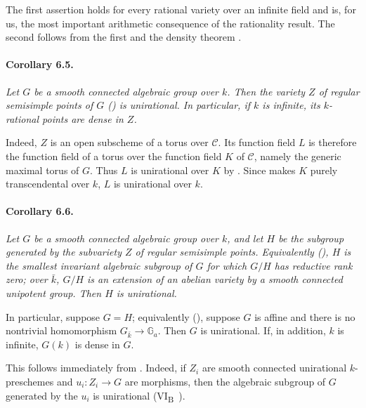 The first assertion holds for every rational variety over an
infinite field and is, for us, the most important arithmetic
consequence of the rationality result. The second follows from
the first and the density theorem .

\paragraph{\textbf{Corollary 6.5.}}
{\itshape Let \(G\) be a smooth connected algebraic group over
\(k\). Then the variety \(Z\) of regular semisimple points of
\(G\) \textup{()} is unirational. In particular, if
\(k\) is infinite, its \(k\)-rational points are dense in \(Z\).}

Indeed, \(Z\) is an open subscheme of a torus over
\(\mathcal C\). Its function field \(L\) is therefore the
function field of a torus over the function field \(K\) of
\(\mathcal C\), namely the generic maximal torus of \(G\). Thus
\(L\) is unirational over \(K\) by . Since  makes
\(K\) purely transcendental over \(k\), \(L\) is unirational
over \(k\).

\paragraph{\textbf{Corollary 6.6.}}
{\itshape Let \(G\) be a smooth connected algebraic group over
\(k\), and let \(H\) be the subgroup generated by the subvariety
\(Z\) of regular semisimple points. Equivalently
\textup{()}, \(H\) is the smallest invariant algebraic
subgroup of \(G\) for which \(G/H\) has reductive rank zero; over
\(\bar k\), \(G/H\) is an extension of an abelian variety by a
smooth connected unipotent group. Then \(H\) is unirational.

In particular, suppose \(G=H\); equivalently
\textup{()}, suppose \(G\) is affine and there is no
nontrivial homomorphism \(G_{\bar k}\to\mathbb G_a\). Then \(G\)
is unirational. If, in addition, \(k\) is infinite, \(G(k)\) is
dense in \(G\).}

This follows immediately from . Indeed, if \(Z_i\) are smooth
connected unirational \(k\)-preschemes and
\(u_i\colon Z_i\to G\) are morphisms, then the algebraic subgroup
of \(G\) generated by the \(u_i\) is unirational
\textup{(VI\textsubscript{B}~)}.

